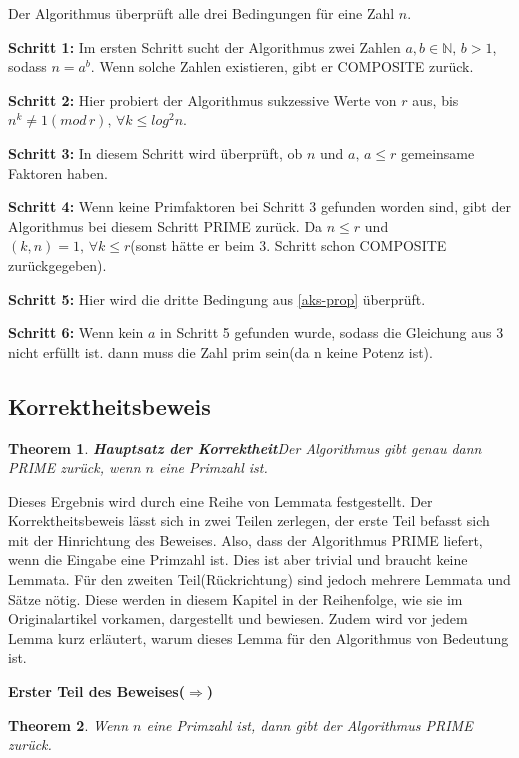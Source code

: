 \documentclass[12pt,oneside]{article}
\newtheorem{theorem}{Theorem}[section]
\theoremstyle{remark}
\theoremstyle{definition}
\begin{document}
Der Algorithmus überprüft alle drei Bedingungen für eine Zahl $n$.\newline

\textbf{Schritt 1: }Im ersten Schritt sucht der Algorithmus zwei Zahlen $a,b \in \mathbb{N}, \, b > 1$, sodass $n = a^b$. Wenn solche Zahlen existieren, gibt er COMPOSITE zurück.  

\textbf{Schritt 2: }Hier probiert der Algorithmus sukzessive Werte von $r$ aus, bis $n^k \neq 1 (mod \, r), \, \forall k \leq log^2 n$.

\textbf{Schritt 3: }In diesem Schritt wird überprüft, ob $n$ und $a, \, a \leq r$ gemeinsame Faktoren haben. 

\textbf{Schritt 4: } Wenn keine Primfaktoren bei Schritt 3 gefunden worden sind, gibt der Algorithmus bei diesem Schritt PRIME zurück. Da $n \leq r$ und $(k,n) = 1, \, \forall k \leq r $(sonst hätte er beim 3. Schritt schon COMPOSITE zurückgegeben).

\textbf{Schritt 5: } Hier wird die dritte Bedingung aus \ref{aks-prop} überprüft.

\textbf{Schritt 6: } Wenn kein $a$ in Schritt 5 gefunden wurde, sodass die Gleichung aus 3 nicht erfüllt ist. dann muss die Zahl prim sein(da n keine Potenz ist). 
\subsection{Korrektheitsbeweis}

\begin{theorem}
\textbf{Hauptsatz der Korrektheit}\newline Der Algorithmus gibt genau dann PRIME zurück, wenn $n$ eine Primzahl ist.
\end{theorem}
Dieses Ergebnis wird durch eine Reihe von Lemmata festgestellt. Der Korrektheitsbeweis lässt sich in zwei Teilen zerlegen, der erste Teil befasst sich mit der Hinrichtung des Beweises. Also, dass der Algorithmus PRIME liefert, wenn die Eingabe eine Primzahl ist. Dies ist aber trivial und braucht keine Lemmata. Für den zweiten Teil(Rückrichtung) sind jedoch mehrere Lemmata und Sätze nötig. Diese werden in diesem Kapitel in der Reihenfolge, wie sie im Originalartikel vorkamen, dargestellt und bewiesen. Zudem wird vor jedem Lemma kurz erläutert, warum dieses Lemma für den Algorithmus von Bedeutung ist.

\textbf{Erster Teil des Beweises($\Rightarrow$)}
\begin{theorem}\label{hin_rich}
Wenn $n$ eine Primzahl ist, dann gibt der Algorithmus PRIME zurück.
\end{theorem}
\end{document}

